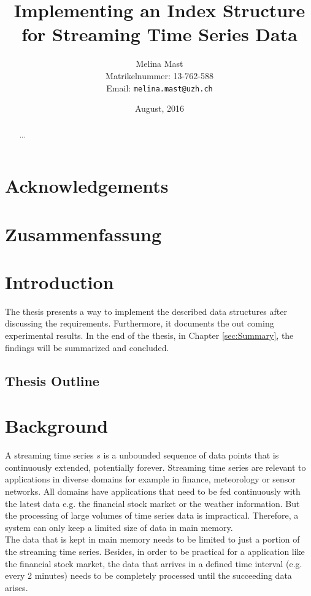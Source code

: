 \documentclass[abstracton,12pt]{scrreprt}
\title{Implementing an Index Structure for Streaming Time Series Data}
\author{
  Melina Mast\\[-5pt]
  \scriptsize Matrikelnummer: 13-762-588\\[-5pt]
  \scriptsize Email: \texttt{melina.mast@uzh.ch}
}
\date{\vspace*{2cm}August, 2016}
\begin{document}
\maketitle

\chapter*{Acknowledgements}



\begin{abstract}
  ...
\end{abstract}

\chapter*{Zusammenfassung}

\tableofcontents
\listoffigures
\listoftables
\renewcommand{\lstlistingname}{Algorithm}%

\listofalgorithms
{}

\chapter{Introduction}

The thesis presents a way to implement the described data structures after discussing the requirements. Furthermore, it documents the out coming experimental results.
In the end of the thesis, in Chapter \ref{sec:Summary}, the findings will be summarized and concluded.

\section{Thesis Outline}


\newtheorem{defn}{Definition}[section]
\newtheorem{exmp}{Example}[section]
\newcommand*{\argmin}{\operatornamewithlimits{argmin}\limits}

\chapter{Background}
\label{background}
A streaming time series $s$ is a unbounded sequence of data points that is continuously extended, potentially forever. Streaming time series are relevant to applications in diverse domains for example in finance, meteorology or sensor networks. All domains have applications that need to be fed continuously with the latest data e.g. the financial stock market or the weather information. But the processing of large volumes of time series data is impractical. Therefore, a system can only keep a limited size of data in main memory.\\
The data that is kept in main memory needs to be limited to just a portion of the streaming time series. Besides, in order to be practical for a application like the financial stock market, the data that arrives in a defined time interval (e.g. every 2 minutes) needs to be completely processed until the succeeding data arises.
\end{document}
